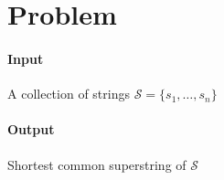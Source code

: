 \documentclass{article}
\begin{document}
	\section{Problem}
	\paragraph{Input}A collection of strings $\mathcal{S}=\{s_1,\dots,s_n\}$
	\paragraph{Output}
	Shortest common superstring of $\mathcal{S}$
\end{document}
